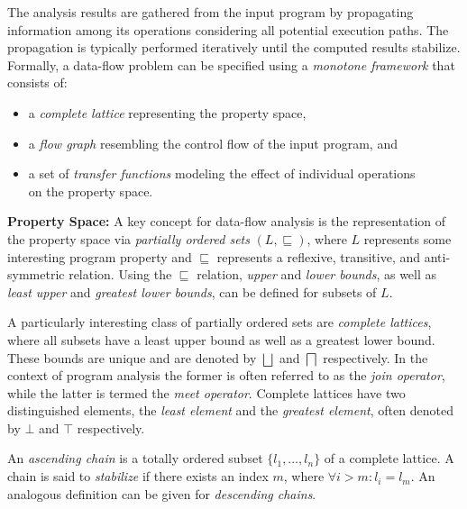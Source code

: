 The analysis results are gathered from the input program by propagating information among its operations considering all potential execution paths. 
The propagation is typically performed iteratively until the computed results stabilize. 
Formally, a data-flow problem can be specified using a \emph{monotone framework} that consists of:
\begin{itemize}
  \item a \emph{complete lattice} representing the property space,
  \item a \emph{flow graph} resembling the control flow of the input program, 
        and
  \item a set of \emph{transfer functions} modeling the effect of individual
        operations \\ on the property space.
\end{itemize}

\textbf{Property Space:}
A key concept for data-flow analysis is the representation of the property space via \emph{partially ordered sets} $(L, \sqsubseteq)$, where $L$ represents some interesting program property and $\sqsubseteq$ represents a reflexive, transitive, and anti-symmetric relation. 
Using the $\sqsubseteq$ relation, \emph{upper} and \emph{lower bounds}, as well as \emph{least upper} and \emph{greatest lower bounds}, can be defined for subsets of $L$.

A particularly interesting class of partially ordered sets are \emph{complete lattices}, where all subsets have a least upper bound as well as a greatest lower bound. 
These bounds are unique and are denoted by $\bigsqcup$ and $\bigsqcap$ respectively. 
In the context of program analysis the former is often referred to as the \emph{join operator}, while the latter is termed the
\emph{meet operator}. Complete lattices have two distinguished elements, the
\emph{least element} and the \emph{greatest element}, often denoted by $\bot$ and $\top$ respectively.

An \emph{ascending chain} is a totally ordered subset $\{l_1, \ldots, l_n \}$ of a complete lattice. 
A chain is said to \emph{stabilize} if there exists an index $m$, where $\forall i > m \colon l_i = l_m$. 
An analogous definition can be given for \emph{descending chains}.

